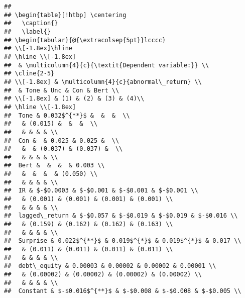 \documentclass[
]{article}
\begin{document}
\begin{verbatim}
## 
## \begin{table}[!htbp] \centering 
##   \caption{} 
##   \label{} 
## \begin{tabular}{@{\extracolsep{5pt}}lcccc} 
## \\[-1.8ex]\hline 
## \hline \\[-1.8ex] 
##  & \multicolumn{4}{c}{\textit{Dependent variable:}} \\ 
## \cline{2-5} 
## \\[-1.8ex] & \multicolumn{4}{c}{abnormal\_return} \\ 
##  & Tone & Unc & Con & Bert \\ 
## \\[-1.8ex] & (1) & (2) & (3) & (4)\\ 
## \hline \\[-1.8ex] 
##  Tone & 0.032$^{**}$ &  &  &  \\ 
##   & (0.015) &  &  &  \\ 
##   & & & & \\ 
##  Con &  & 0.025 & 0.025 &  \\ 
##   &  & (0.037) & (0.037) &  \\ 
##   & & & & \\ 
##  Bert &  &  &  & 0.003 \\ 
##   &  &  &  & (0.050) \\ 
##   & & & & \\ 
##  IR & $-$0.0003 & $-$0.001 & $-$0.001 & $-$0.001 \\ 
##   & (0.001) & (0.001) & (0.001) & (0.001) \\ 
##   & & & & \\ 
##  lagged\_return & $-$0.057 & $-$0.019 & $-$0.019 & $-$0.016 \\ 
##   & (0.159) & (0.162) & (0.162) & (0.163) \\ 
##   & & & & \\ 
##  Surprise & 0.022$^{**}$ & 0.019$^{*}$ & 0.019$^{*}$ & 0.017 \\ 
##   & (0.011) & (0.011) & (0.011) & (0.011) \\ 
##   & & & & \\ 
##  debt\_equity & 0.00003 & 0.00002 & 0.00002 & 0.00001 \\ 
##   & (0.00002) & (0.00002) & (0.00002) & (0.00002) \\ 
##   & & & & \\ 
##  Constant & $-$0.016$^{**}$ & $-$0.008 & $-$0.008 & $-$0.005 \\ 

\end{verbatim}
\end{document}
